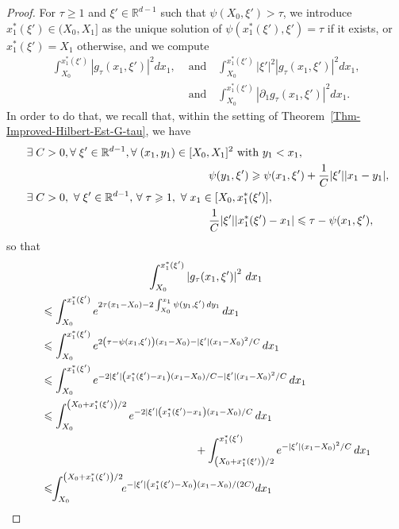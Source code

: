 \documentclass[AHL,Unicode,longabstracts]{cedram}
\newcommand*\R{\mathbb{R}}
\renewcommand{\leq}{\leqslant}
\renewcommand{\geq}{\geqslant}
\let\oldexists\exists
\renewcommand*{\exists}{\mathrel{\oldexists}}
\let\oldforall\forall
\renewcommand*{\forall}{\mathrel{\oldforall}}
\begin{document}
\begin{proof}
For $\tau \geq 1$ and $\xi' \in \R^{d-1}$ such that $\psi(X_0, \xi') > \tau$, we introduce $x_1^*(\xi') \in (X_0, X_1]$ as the unique solution of $\psi(x_1^*(\xi'), \xi') = \tau$ if it exists, or $x_1^*(\xi') = X_1$ otherwise, and we compute
\pagebreak
\begin{align*}
\int_{X_0}^{x_1^*(\xi')} \left|g_\tau(x_1, \xi')\right|^2 dx_1,
&\text{ and}
\quad
\int_{X_0}^{x_1^*(\xi')} |\xi'|^2 \left|g_\tau(x_1, \xi')\right|^2 dx_1,\\
&\text{ and} 
\quad
\int_{X_0}^{x_1^*(\xi')} \left|\partial_1 g_\tau(x_1, \xi')\right|^2 dx_1.
\end{align*}
In order to do that, we recall that, within the setting of Theorem~\ref{Thm-Improved-Hilbert-Est-G-tau}, we have
\begin{align*}
&\exists C > 0, \forall \xi' \in  \R^{d-1}, \forall (x_1,y_1)  \in  [ X_0, X_1 ]^2\text{ with } y_1  <  x_1,
\\
&\mkern300mu \psi(y_1, \xi') \geq  \psi(x_1, \xi')  + \frac{1}{C} |\xi'| |x_1  -  y_1|,
\\
&
\exists C>0, \ \forall \xi' \in \R^{d-1},\, \forall \tau \geq 1, \ \forall x_1 \in [X_0, x_1^*(\xi')],\\
&\mkern300mu
\frac{1}{C} |\xi'| |x_1^*(\xi') - x_1| \leq \tau - \psi(x_1, \xi'),
\end{align*}
so that
\begin{multline*}
\int_{X_0}^{x_1^*(\xi')} \left|g_\tau(x_1, \xi')\right|^2 \, dx_1\\
\begin{aligned}
&\leq
\int_{X_0}^{x_1^*(\xi')} e^{2 \tau (x_1 -X_0) - 2 \int_{X_0}^{x_1} \psi(y_1, \xi') \, dy_1 } \, dx_1
\\
& \leq
\int_{X_0}^{x_1^*(\xi')} e^{2 \left(\tau - \psi(x_1, \xi')\right) (x_1 -X_0) - |\xi'| (x_1- X_0)^2/C } \, dx_1
\\
& \leq
\int_{X_0}^{x_1^*(\xi')} e^{- 2 |\xi'| \left(x_1^*(\xi') - x_1\right) (x_1 -X_0)/C - |\xi'| (x_1- X_0)^2/C} \, dx_1
\\
& \leq
\int_{X_0}^{\left(X_0+x_1^*(\xi')\right)/2}e^{- 2|\xi'| \left(x_1^*(\xi') - x_1\right) (x_1 -X_0)/C } \, dx_1 \\
&\mkern250mu+
\int_{\left(X_0+x_1^*(\xi')\right)/2}^{x_1^*(\xi')} e^{ - |\xi'| (x_1- X_0)^2/C} \, dx_1
\\
& \leq \!\!
\int_{X_0}^{\left(X_0+x_1^*(\xi')\right)/2}\!\!e^{- |\xi'| \left(x_1^*(\xi') - X_0\right) (x_1 -X_0)/(2C)} dx_1 
\\

\end{aligned}
\end{multline*}
\end{proof}
\end{document}

